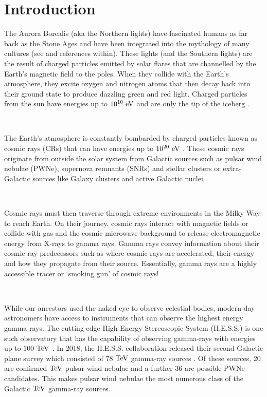 \chapter{Introduction}

The Aurora Borealis (aka the Northern lights) have fascinated humans as far back as the Stone Ages and have been integrated into the mythology of many cultures (see \cite{1980mlas.book.....E} and references within). These lights (and the Southern lights) are the result of charged particles emitted by solar flares that are channelled by the Earth's magnetic field to the poles. When they collide with the Earth's atmosphere, they excite oxygen and nitrogen atoms that then decay back into their ground state to produce dazzling green and red light. Charged particles from the sun have energies up to $10^{10}~\si{\electronvolt}$ and are only the tip of the iceberg \citep{2011hea..book.....L}. 
\par~\par
The Earth's atmosphere is constantly bombarded by charged particles known as cosmic rays (CRs) that can have energies up to $10^{20}~\si{\electronvolt}$ \citep{alma9924446790001811}. These cosmic rays originate from outside the solar system from Galactic sources such as pulsar wind nebulae (PWNe), supernova remnants (SNRs) and stellar clusters or extra-Galactic sources like Galaxy clusters and active Galactic nuclei.
\par~\par
Cosmic rays must then traverse through extreme environments in the Milky Way to reach Earth. On their journey, cosmic rays interact with magnetic fields or collide with gas and the cosmic microwave background to release electromagnetic energy from X-rays to gamma rays. Gamma rays convey information about their cosmic-ray predecessors such as where cosmic rays are accelerated, their energy and how they propagate from their source. Essentially, gamma rays are a highly accessible tracer or `smoking gun' of cosmic rays! 
\par~\par 
While our ancestors used the naked eye to observe celestial bodies, modern day astronomers have access to instruments that can observe the highest energy gamma rays. The cutting-edge High Energy Stereoscopic System (H.E.S.S.) is one such observatory that has the capability of observing gamma-rays with energies up to $100~\TeV$ \citep{HESS}. In 2018, the H.E.S.S. collaboration released their second Galactic plane survey which consisted of 78 $\TeV$ gamma-ray sources \citep{2018A&A...612A...1H}. Of these sources, 20 are confirmed $\TeV$ pulsar wind nebulae and a further 36 are possible PWNe candidates. This makes pulsar wind nebulae the most numerous class of the Galactic $\TeV$ gamma-ray sources.
